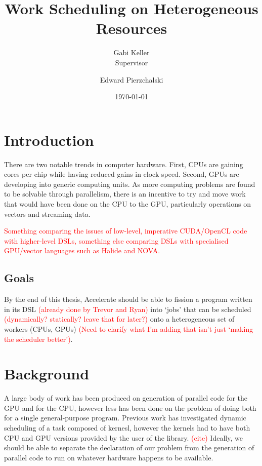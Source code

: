 \documentclass[a4paper,12pt]{article}
\title{Work Scheduling on Heterogeneous Resources}
\date{\today}
\author{Gabi Keller\\\small{Supervisor} \and Edward Pierzchalski}
\newcommand{\red}[1]{\textcolor{red}{#1}}
\begin{document}
\maketitle

\pagebreak

\begin{multicols*}{2}

\section{Introduction}

There are two notable trends in computer hardware. First, CPUs are gaining cores per chip while having reduced gains in clock speed. Second, GPUs are developing into generic computing units. As more computing problems are found to be solvable through parallelism, there is an incentive to try and move work that would have been done on the CPU to the GPU, particularly operations on vectors and streaming data.

\red{Something comparing the issues of low-level, imperative CUDA/OpenCL code with higher-level DSLs, something else comparing DSLs with specialised GPU/vector languages such as Halide and NOVA.}


\subsection{Goals}

By the end of this thesis, Accelerate should be able to fission a program written in its DSL \red{(already done by Trevor and Ryan)} into `jobs' that can be scheduled \red{(dynamically? statically? leave that for later?)} onto a heterogeneous set of workers (CPUs, GPUs) \red{(Need to clarify what I'm adding that isn't just `making the scheduler better')}.


\section{Background}

A large body of work has been produced on generation of parallel code for the GPU and for the CPU, however less has been done on the problem of doing both for a single general-purpose program. Previous work has investigated dynamic scheduling of a task composed of kernesl, however the kernels had to have both CPU and GPU versions provided by the user of the library. \red{(cite)} Ideally, we should be able to separate the declaration of our problem from the generation of parallel code to run on whatever hardware happens to be available.


\end{multicols*}
\end{document}
